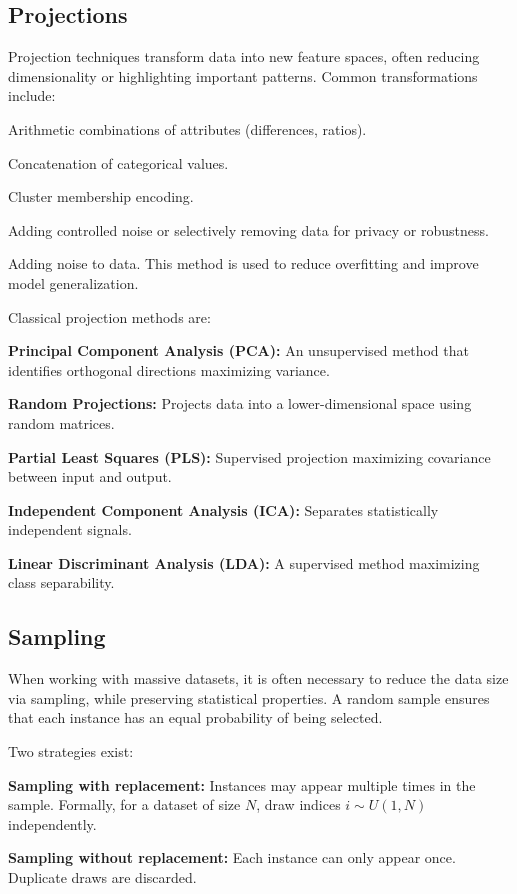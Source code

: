     \subsection{Projections}
    Projection techniques transform data into new feature spaces, often reducing dimensionality or highlighting important patterns. Common transformations include:
    \begin{compactitemize}
        \item Arithmetic combinations of attributes (differences, ratios).
        \item Concatenation of categorical values.
        \item Cluster membership encoding.
        \item Adding controlled noise or selectively removing data for privacy or robustness.
        \item Adding noise to data. This method is used to reduce overfitting and improve model generalization.
    \end{compactitemize}
    
    Classical projection methods are:
    \begin{compactitemize}
        \item \textbf{Principal Component Analysis (PCA):} An unsupervised method that identifies orthogonal directions maximizing variance.
        \item \textbf{Random Projections:} Projects data into a lower-dimensional space using random matrices.
        \item \textbf{Partial Least Squares (PLS):} Supervised projection maximizing covariance between input and output.
        \item \textbf{Independent Component Analysis (ICA):} Separates statistically independent signals.
        \item \textbf{Linear Discriminant Analysis (LDA):} A supervised method maximizing class separability.
    \end{compactitemize}
    
    \subsection{Sampling}
    When working with massive datasets, it is often necessary to reduce the data size via sampling, while preserving statistical properties. A random sample ensures that each instance has an equal probability of being selected.
    
    Two strategies exist:
    \begin{compactitemize}
        \item \textbf{Sampling with replacement:} Instances may appear multiple times in the sample. Formally, for a dataset of size $N$, draw indices $i \sim U(1,N)$ independently.
        \item \textbf{Sampling without replacement:} Each instance can only appear once. Duplicate draws are discarded.
    \end{compactitemize}
    
